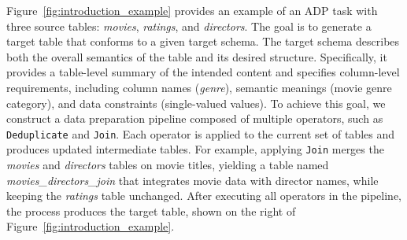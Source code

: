\begin{example}
Figure~\ref{fig:introduction_example} provides an example of an ADP task with three source tables: \textit{movies}, \textit{ratings}, and \textit{directors}. The goal is to generate a target table that conforms to a given target schema. The target schema describes both the overall semantics of the table and its desired structure. Specifically, it provides a table-level summary of the intended content and specifies column-level requirements, including column names (\eg \textit{genre}), semantic meanings (\eg movie genre category), and data constraints (\eg single-valued values).
To achieve this goal, we construct a data preparation pipeline composed of multiple operators, such as \texttt{Deduplicate} and \texttt{Join}. Each operator is applied to the current set of tables and produces updated intermediate tables. For example, applying \texttt{Join} merges the \textit{movies} and \textit{directors} tables on movie titles, yielding a table named \textit{movies\_directors\_join} that integrates movie data with director names, while keeping the \textit{ratings} table unchanged.
After executing all operators in the pipeline, the process produces the target table, shown on the right of Figure~\ref{fig:introduction_example}. 
\end{example}

